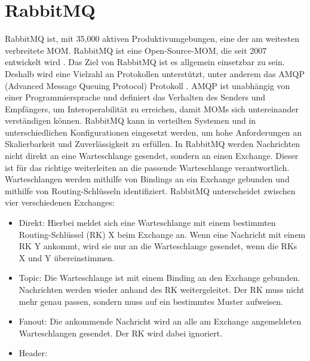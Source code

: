 \section{RabbitMQ}
RabbitMQ ist, mit 35,000 aktiven Produktivumgebungen, eine der am weitesten verbreitete MOM. 
RabbitMQ ist eine Open-Source-MOM, die seit 2007 entwickelt wird \cite{rabbitmq}. Das Ziel von RabbitMQ ist es allgemein einsetzbar zu sein. Deshalb wird eine Vielzahl an Protokollen unterstützt, unter anderem das AMQP (Advanced Message Queuing Protocol) Protokoll \cite{amqp}. AMQP ist unabhängig von einer Programmiersprache und definiert das Verhalten des Senders und Empfängers, um Interoperabilität zu erreichen, damit MOMs sich untereinander verständigen können. RabbitMQ kann in verteilten Systemen und in unterschiedlichen Konfigurationen eingesetzt werden, um hohe Anforderungen an Skalierbarkeit und Zuverlässigkeit zu erfüllen. In RabbitMQ werden Nachrichten nicht direkt an eine Warteschlange gesendet, sondern an einen Exchange. Dieser ist für das richtige weiterleiten an die passende Warteschlange verantwortlich. Warteschlangen werden mithilfe von Bindings an ein Exchange gebunden und mithilfe von Routing-Schlüsseln identifiziert. RabbitMQ unterscheidet zwischen vier verschiedenen Exchanges:
\begin{itemize}
    \item Direkt: Hierbei meldet sich eine Warteschlange mit einem bestimmten Routing-Schlüssel (RK) X beim Exchange an. Wenn eine Nachricht mit einem RK Y ankommt, wird sie nur an die Warteschlange gesendet, wenn die RKs X und Y übereinstimmen.
    \item Topic: Die Warteschlange ist mit einem Binding an den Exchange gebunden. Nachrichten werden wieder anhand des RK weitergeleitet. Der RK muss nicht mehr genau passen, sondern muss auf ein bestimmtes Muster aufweisen.
    \item Fanout: Die ankommende Nachricht wird an alle am Exchange angemeldeten Warteschlangen gesendet. Der RK wird dabei ignoriert.
    \item Header:
\end{itemize}
